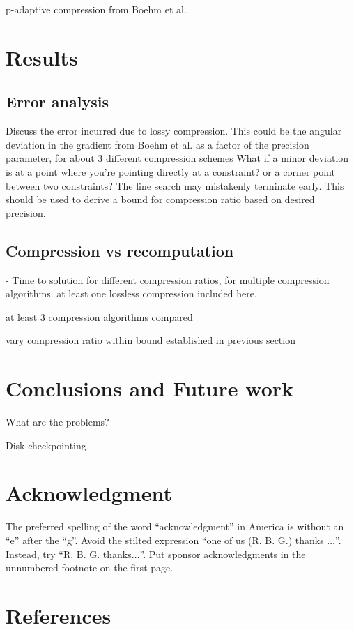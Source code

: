 \documentclass[conference]{IEEEtran}
\begin{document}
p-adaptive compression from Boehm et al. 
\section{Results}
\subsection{Error analysis}
Discuss the error incurred due to lossy compression. This could be the
angular deviation in the gradient from Boehm et al. as a factor of the
precision parameter, for about 3 different compression schemes  What if a minor
deviation is at a point where you're pointing directly at a
constraint? or a corner point between two constraints? The line search
may mistakenly terminate early. This should be used to derive a bound
for compression ratio based on desired precision. 

\subsection{Compression vs recomputation}

- Time to solution for different compression ratios, for multiple
compression algorithms. at least one lossless compression included
here.

at least 3 compression algorithms compared

vary compression ratio within bound established in previous section

\section{Conclusions and Future work}

What are the problems?

Disk checkpointing

\section*{Acknowledgment}

The preferred spelling of the word ``acknowledgment'' in America is without 
an ``e'' after the ``g''. Avoid the stilted expression ``one of us (R. B. 
G.) thanks $\ldots$''. Instead, try ``R. B. G. thanks$\ldots$''. Put sponsor 
acknowledgments in the unnumbered footnote on the first page.

\section*{References}
\end{document}
